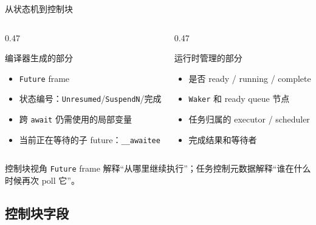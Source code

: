 \documentclass[aspectratio=169,11pt]{beamer}
\begin{document}
\begin{frame}{从状态机到控制块}
  \begin{columns}[T,totalwidth=\textwidth]
    \begin{column}{0.47\textwidth}
      \begin{block}{编译器生成的部分}
        \begin{itemize}
          \item \texttt{Future} frame
          \item 状态编号：\texttt{Unresumed}/\texttt{SuspendN}/完成
          \item 跨 \texttt{await} 仍需使用的局部变量
          \item 当前正在等待的子 future：\texttt{\_\_awaitee}
        \end{itemize}
      \end{block}
    \end{column}
    \begin{column}{0.47\textwidth}
      \begin{block}{运行时管理的部分}
        \begin{itemize}
          \item 是否 ready / running / complete
          \item \texttt{Waker} 和 ready queue 节点
          \item 任务归属的 executor / scheduler
          \item 完成结果和等待者
        \end{itemize}
      \end{block}
    \end{column}
  \end{columns}

  \vspace{0.7em}
  \begin{alertblock}{控制块视角}
    \texttt{Future} frame 解释“从哪里继续执行”；任务控制元数据解释“谁在什么时候再次 poll 它”。
  \end{alertblock}
\end{frame}

\subsection{控制块字段}
\end{document}
